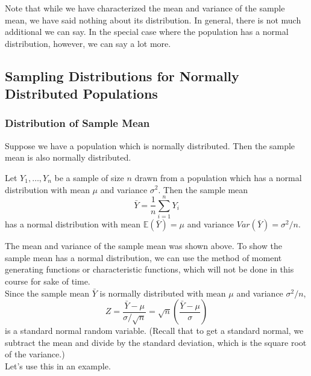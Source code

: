 \documentclass[12pt]{article}
\theoremstyle{definition}
\theoremstyle{remark}
\def\E{{\mathbb E}}
\begin{document}
Note that while we have characterized the mean and variance of the sample mean, we have said nothing about its distribution. In general, there is not much additional we can say. In the special case where the population has a normal distribution, however, we can say a lot more.

\subsection{Sampling Distributions for Normally Distributed Populations}

\subsubsection{Distribution of Sample Mean}

Suppose we have a population which is normally distributed. Then the sample mean is also normally distributed.

\begin{framed}
Let $Y_1, \dots, Y_n$ be a sample of size $n$ drawn from a population which has a normal distribution with mean $\mu$ and variance $\sigma^2$. Then the sample mean
\[
\bar{Y} = \frac{1}{n} \sum_{i=1}^n Y_i
\]
has a normal distribution with mean $\E(\bar{Y}) = \mu$ and variance $Var(\bar{Y}) = \sigma^2 / n$.
\end{framed}
The mean and variance of the sample mean was shown above. To show the sample mean has a normal distribution, we can use the method of moment generating functions or characteristic functions, which will not be done in this course for sake of time.\\

Since the sample mean $\bar{Y}$ is normally distributed with mean $\mu$ and variance $\sigma^2 / n$, 
\[
Z = \frac{\bar{Y} - \mu}{\sigma / \sqrt{n} } = \sqrt{n}\left( \frac{\bar{Y} - \mu}{\sigma }\right)
\]
is a standard normal random variable. (Recall that to get a standard normal, we subtract the mean and divide by the standard deviation, which is the square root of the variance.)\\

Let's use this in an example.
\end{document}
